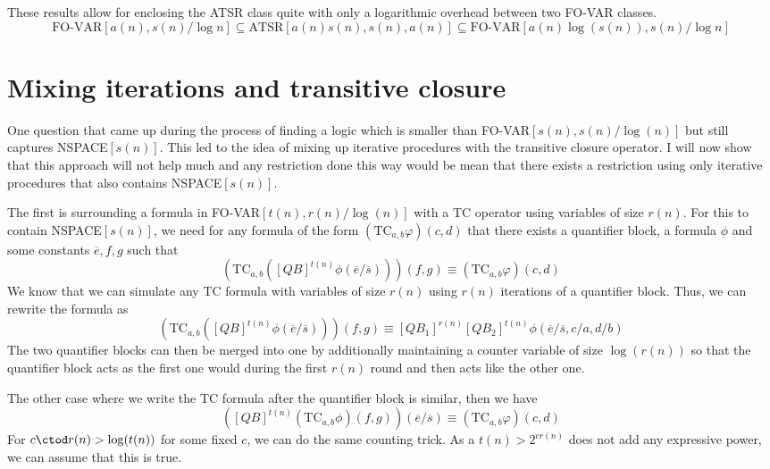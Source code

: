 These results allow for enclosing the ATSR class quite with only a logarithmic overhead between two FO-VAR classes.
\[
    \text{FO-VAR}\left[ a(n), s(n)/\log n \right] \subseteq \text{ATSR}[a(n)s(n), s(n), a(n)] \subseteq \text{FO-VAR}\left[ a(n)\log(s(n)), s(n)/\log n \right]
\]

\section{Mixing iterations and transitive closure}\label{sec:mixing-iterations-and-transitive-closure}

One question that came up during the process of finding a logic which is smaller than FO-VAR$[s(n), s(n)/\log(n)]$ but still captures NSPACE$[s(n)]$.
This led to the idea of mixing up iterative procedures with the transitive closure operator.
I will now show that this approach will not help much and any restriction done this way would be mean that there exists a restriction using only iterative procedures that also contains NSPACE$[s(n)]$.

The first is surrounding a formula in FO-VAR$[t(n), r(n)/\log(n)]$ with a TC operator using variables of size $r(n)$.
For this to contain NSPACE$[s(n)]$, we need for any formula of the form $(\text{TC}_{a, b}\varphi)(c, d)$ that there exists a quantifier block, a formula $\phi$ and some constants $\overline{e}, f, g$ such that
\[
    \left(\text{TC}_{a, b}\left([QB]^{t(n)}\phi(\overline{e}/\overline{s})\right)\right)(f, g) \equiv (\text{TC}_{a, b}\varphi)(c, d)
\]
We know that we can simulate any TC formula with variables of size $r(n)$ using $r(n)$ iterations of a quantifier block.
Thus, we can rewrite the formula as
\[
    \left(\text{TC}_{a, b}\left([QB]^{t(n)}\phi(\overline{e}/\overline{s})\right)\right)(f, g) \equiv [QB_1]^{r(n)}[QB_2]^{t(n)}\phi(\overline{e}/\overline{s}, c/a, d/b)
\]
The two quantifier blocks can then be merged into one by additionally maintaining a counter variable of size $\log(r(n))$ so that the quantifier block acts as the first one would during the first $r(n)$ round and then acts like the other one.

The other case where we write the TC formula after the quantifier block is similar, then we have
\[
    \left([QB]^{t(n)}\left(\text{TC}_{a, b}\phi\right)(f, g)\right)(\overline{e}/\overline{s}) \equiv (\text{TC}_{a, b}\varphi)(c, d)
\]
For $c \ctod r(n) > \log(t(n))$ for some fixed $c$, we can do the same counting trick.
As a $t(n) > 2^{cr(n)}$ does not add any expressive power, we can assume that this is true.

